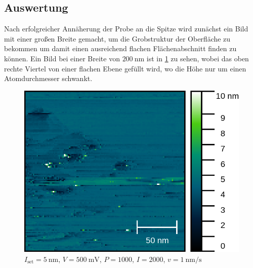 \subsection*{Auswertung}

Nach erfolgreicher Annäherung der Probe an die Spitze wird zunächst ein Bild
mit einer großen Breite gemacht, um die Grobstruktur der Oberfläche
zu bekommen um damit einen ausreichend flachen Flächenabschnitt
finden zu können. Ein Bild bei einer Breite von $\SI{200}{\nm}$ ist in 
\cref{fig:hopg_rtm_weitaufnahme} zu sehen, wobei das oben rechte Viertel 
von einer flachen Ebene gefüllt wird, wo die Höhe nur um einen Atomdurchmesser schwankt.

\begin{figure}[htb]
	\centering
	\includegraphics[width=0.6\linewidth]{figs/HOPG10558.png}
	\caption{$I_\mathrm{set}=\SI{5}{\nm}$, $V=\SI{500}{\milli\volt}$, $P=1000$, $I=2000$,
		$v=\SI{1}{\nm\per\s}$}
	\label{fig:hopg_rtm_weitaufnahme}
\end{figure}

